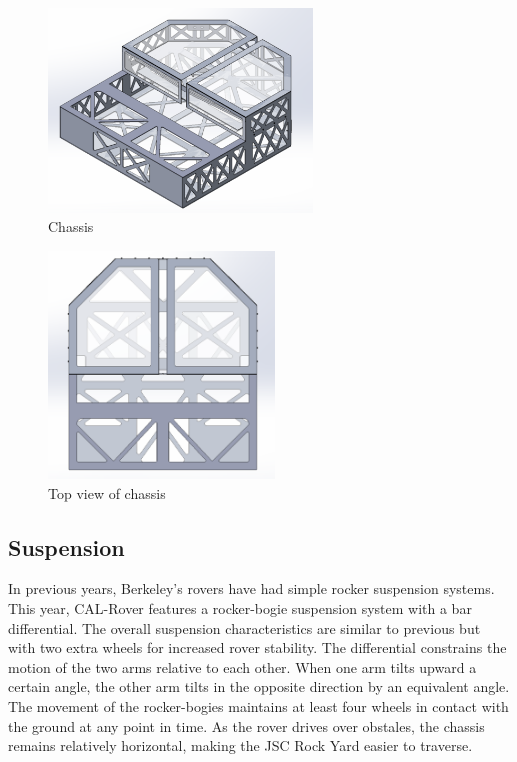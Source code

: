 \documentclass[titlepage,twocolumn,10pt]{article}
\begin{document}
    \begin{figure}[H]
        \centering
        \includegraphics*[width = 7cm]{images/chassis.png}
        \caption{Chassis}
    \end{figure}

    \begin{figure}[H]
        \centering
        \includegraphics*[width = 6cm]{images/chassistop.png}
        \caption{Top view of chassis}
    \end{figure}

    \subsection{Suspension}
    In previous years, Berkeley's rovers have had simple rocker suspension systems. This year, CAL-Rover features a rocker-bogie suspension system with a bar differential. The overall suspension characteristics are similar to previous but with two extra wheels for increased rover stability. The differential constrains the motion of the two arms relative to each other. When one arm tilts upward a certain angle, the other arm tilts in the opposite direction by an equivalent angle. The movement of the rocker-bogies maintains at least four wheels in contact with the ground at any point in time. As the rover drives over obstales, the chassis remains relatively horizontal, making the JSC Rock Yard easier to traverse.
\end{document}
